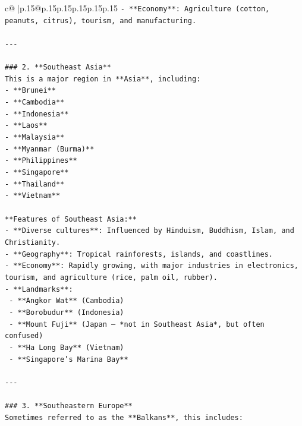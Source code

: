 \documentclass{article}
\begin{document}
{\begin{supertabular}{c@{$\;$}|p{.15\linewidth}@{}p{.15\linewidth}p{.15\linewidth}p{.15\linewidth}p{.15\linewidth}p{.15\linewidth}}
{{{\texttt{{-} **Economy**: Agriculture (cotton, peanuts, citrus), tourism, and manufacturing.} \\
\\ 
\texttt{{-}{-}{-}} \\
\\ 
\texttt{\#\#\# 2. **Southeast Asia**} \\
\texttt{This is a major region in **Asia**, including:} \\
\texttt{{-} **Brunei**} \\
\texttt{{-} **Cambodia**} \\
\texttt{{-} **Indonesia**} \\
\texttt{{-} **Laos**} \\
\texttt{{-} **Malaysia**} \\
\texttt{{-} **Myanmar (Burma)**} \\
\texttt{{-} **Philippines**} \\
\texttt{{-} **Singapore**} \\
\texttt{{-} **Thailand**} \\
\texttt{{-} **Vietnam**} \\
\\ 
\texttt{**Features of Southeast Asia:**} \\
\texttt{{-} **Diverse cultures**: Influenced by Hinduism, Buddhism, Islam, and Christianity.} \\
\texttt{{-} **Geography**: Tropical rainforests, islands, and coastlines.} \\
\texttt{{-} **Economy**: Rapidly growing, with major industries in electronics, tourism, and agriculture (rice, palm oil, rubber).} \\
\texttt{{-} **Landmarks**:  } \\
\texttt{  {-} **Angkor Wat** (Cambodia)  } \\
\texttt{  {-} **Borobudur** (Indonesia)  } \\
\texttt{  {-} **Mount Fuji** (Japan — *not in Southeast Asia*, but often confused)  } \\
\texttt{  {-} **Ha Long Bay** (Vietnam)  } \\
\texttt{  {-} **Singapore’s Marina Bay**  } \\
\\ 
\texttt{{-}{-}{-}} \\
\\ 
\texttt{\#\#\# 3. **Southeastern Europe**} \\
\texttt{Sometimes referred to as the **Balkans**, this includes:} \\
}}}
\end{supertabular}}
\end{document}
